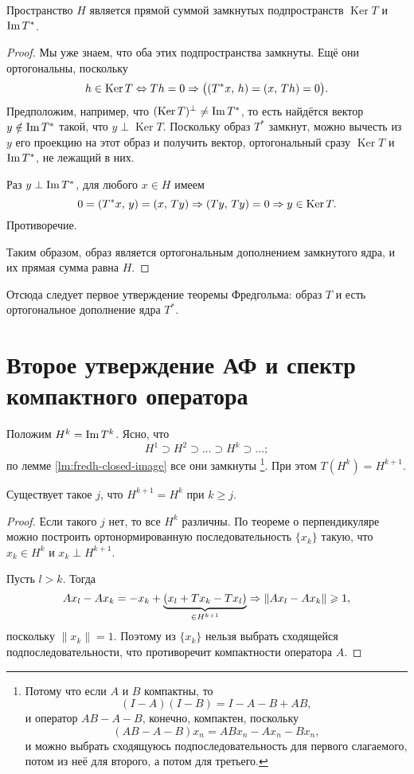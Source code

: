\documentclass{notes}
\DeclareMathOperator{\Ker}{Ker}
\begin{document}
	\begin{lm} \label{lm:fredh-direct-sum}
		Пространство $H$ является прямой суммой замкнутых подпространств $\Ker T$ и $\operatorname{Im} T^*$.
		\begin{proof}
			Мы уже знаем, что оба этих подпространства замкнуты. Ещё они ортогональны, поскольку
			\[
				h \in \Ker T \eqv Th = 0 \so \big((T^*x, \, h) = (x, \, T h) = 0\big). 
			\]
			Предположим, например, что $(\Ker T)^{\perp} \neq \im T^*$, то есть найдётся вектор $y \notin \operatorname{Im} T^*$ такой, что $y \perp \Ker T$. Поскольку образ $T^*$ замкнут, можно вычесть из $y$ его проекцию на этот образ и получить вектор, ортогональный сразу $\Ker T$ и $\operatorname{Im} T^*$, не лежащий в них.

			Раз $y \perp \operatorname{Im} T^*$, для любого $x \in H$ имеем
			\[	
				0 = (T^*x, \, y) = (x, \, Ty) \so (Ty, \, Ty) = 0 \so y \in \Ker T.
			\]
			Противоречие.

			Таким образом, образ является ортогональным дополнением замкнутого ядра, и их прямая сумма равна $H$.
		\end{proof}
	\end{lm}

	Отсюда следует первое утверждение теоремы Фредгольма: образ $T$ и есть ортогональное дополнение ядра $T^*$.

\section{Второе утверждение АФ и спектр компактного оператора}

	Положим $H^k = \operatorname{Im} T^k$. Ясно, что
	\[
		H^1 \supset H^2 \supset \ldots \supset H^k \supset \ldots;
	\]
	по лемме \ref{lm:fredh-closed-image} все они замкнуты \footnote{Потому что если $A$ и $B$ компактны, то
	\[
		(I - A)(I - B) = I - A - B + AB,
	\]
	и оператор $AB - A - B$, конечно, компактен, поскольку
	\[
		(AB - A - B)x_n = ABx_n - Ax_n - Bx_n,
	\]
	и можно выбрать сходящуюсь подпоследовательность для первого слагаемого, потом из неё для второго, а потом для третьего.
	}. При этом $T(H^k) = H^{k + 1}$.

	\begin{lm}
		Существует такое $j$, что $H^{k + 1} = H^k$ при $k \geqslant j$.
		\begin{proof}
			Если такого $j$ нет, то все $H^k$ различны. По теореме о перпендикуляре можно построить ортонормированную последовательность $\{x_k\}$ такую, что $x_k \in H^k$ и $x_k \perp H^{k + 1}$. 

			Пусть $l > k$. Тогда
			\[
				Ax_l - Ax_k = -x_k + \underbrace{(x_l + Tx_k - Tx_l)}_{\in H^{k + 1}} \Rightarrow \|Ax_l - Ax_k\| \geqslant 1,
			\]
			поскольку $\|x_k\| = 1$. Поэтому из $\{x_k\}$ нельзя выбрать сходящейся подпоследовательности, что противоречит компактности оператора $A$.
		\end{proof} 
	\end{lm} 
\end{document}
